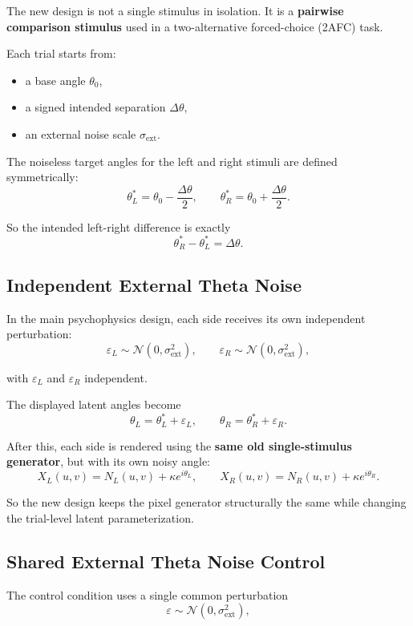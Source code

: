 \documentclass[11pt]{article}
\begin{document}
The new design is not a single stimulus in isolation. It is a
\textbf{pairwise comparison stimulus} used in a two-alternative forced-choice
(2AFC) task.

Each trial starts from:
\begin{itemize}[leftmargin=2em]
\item a base angle $\theta_0$,
\item a signed intended separation $\Delta\theta$,
\item an external noise scale $\sigma_{\mathrm{ext}}$.
\end{itemize}

The noiseless target angles for the left and right stimuli are defined
symmetrically:
\[
\theta_L^{\ast} = \theta_0 - \frac{\Delta\theta}{2},
\qquad
\theta_R^{\ast} = \theta_0 + \frac{\Delta\theta}{2}.
\]

So the intended left-right difference is exactly
\[
\theta_R^{\ast} - \theta_L^{\ast} = \Delta\theta.
\]

\subsection{Independent External Theta Noise}

In the main psychophysics design, each side receives its own independent
perturbation:
\[
\varepsilon_L \sim \mathcal{N}(0, \sigma_{\mathrm{ext}}^2),
\qquad
\varepsilon_R \sim \mathcal{N}(0, \sigma_{\mathrm{ext}}^2),
\]

with $\varepsilon_L$ and $\varepsilon_R$ independent.

The displayed latent angles become
\[
\theta_L = \theta_L^{\ast} + \varepsilon_L,
\qquad
\theta_R = \theta_R^{\ast} + \varepsilon_R.
\]

After this, each side is rendered using the \textbf{same old single-stimulus
generator}, but with its own noisy angle:
\[
X_L(u,v) = N_L(u,v) + \kappa e^{i\theta_L},
\qquad
X_R(u,v) = N_R(u,v) + \kappa e^{i\theta_R}.
\]

So the new design keeps the pixel generator structurally the same while
changing the trial-level latent parameterization.

\subsection{Shared External Theta Noise Control}

The control condition uses a single common perturbation
\[
\varepsilon \sim \mathcal{N}(0, \sigma_{\mathrm{ext}}^2),
\]
\end{document}
